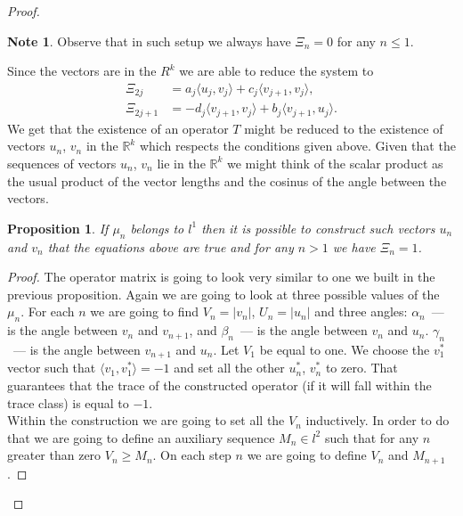 \documentclass[12pt]{article}
\renewcommand{\leq}{\leqslant}
\renewcommand{\geq}{\geqslant}
\newtheorem{prop}{Proposition}
\theoremstyle{definition}
\newtheorem*{note}{Note}
\numberwithin{remark}{section}
\numberwithin{theorem}{section}
\numberwithin{prop}{section}
\numberwithin{equation}{section}
\numberwithin{lemma}{section}
\numberwithin{prop_under_lemma}{lemma}
\begin{document}
\begin{proof}
        \begin{note}
        Observe that in such setup we always have $\Xi_n = 0$ for any $n \leq 1$.
        \end{note}
        Since the vectors are in the $R^k$ we are able to reduce the system to
        \begin{align*}
            \Xi_{2j} &= a_{j} \langle u_{j}, v_{j} \rangle  + c_{j} \langle v_{j+1}, v_{j} \rangle,\\
            \Xi_{2j + 1} &= -d_{j} \langle v_{j+1}, v_{j} \rangle + b_{j} \langle v_{j+1}, u_{j}\rangle.
        \end{align*}
        We get that the existence of an operator $T$
        might be reduced to the existence of vectors $u_n$, $v_n$ in the $\mathbb{R}^k$ which
        respects the conditions given above.
        Given that the sequences of vectors $u_n$, $v_n$ lie in the $\mathbb{R}^k$ we might think of the scalar product as
        the usual product of the vector lengths and the cosinus of the angle between the vectors.
        \begin{prop}
            \label{k-dim-statement}
            If $\mu_n$ belongs to $l^1$ then it is possible to construct such vectors $u_n$ and $v_n$ that the equations above are true and for any $n > 1$ we have $\Xi_n = 1$.
        \end{prop}
        \begin{proof}
            The operator matrix is going to look very similar to one we built in the previous proposition.
            Again we are going to look at three possible values of the $\mu_n$.
            For each $n$ we are going to find $V_n = |v_n|$, $U_n = |u_n|$ and three angles:
            $\alpha_n$~--- is the angle between $v_n$ and $v_{n + 1}$, and
            $\beta_n$~--- is the angle between $v_n$ and $u_n$.
            $\gamma_n$~--- is the angle between $v_{n + 1}$ and $u_n$.
            Let $V_1$ be equal to one.
            We choose the $v^*_1$ vector such that $\langle v_1, v^*_1 \rangle = -1$ and set all
            the other $u^*_n$, $v^*_n$ to zero. That guarantees that the trace of the constructed operator (if it
            will fall within the trace class) is equal to $-1$.\\
            Within the construction we are going to set all the $V_n$ inductively. In order to do
            that we are going to define an auxiliary sequence $M_n \in l^2$ such that for any $n$ greater than zero
            $V_n \geq M_n$. On each step $n$ we are going to define $V_n$ and $M_{n+1}$.
            

\end{proof}
\end{proof}
\end{document}
